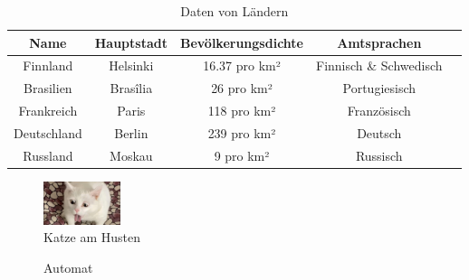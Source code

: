 \documentclass[12pt]{scrartcl}
\begin{document}
\exercise{}
\begin{table}[h!]
\centering
\begin{tabular}{c|c|c|c|c}
Name & Hauptstadt  & Bevölkerungsdichte & Amtsprachen \\ \hline \hline
Finnland & Helsinki & 16.37 pro km² & Finnisch \& Schwedisch  \\ \hline
Brasilien & Brasîlia & 26 pro km² & Portugiesisch  \\ \hline
Frankreich & Paris & 118 pro km² & Französisch  \\ \hline
Deutschland & Berlin & 239 pro km² & Deutsch \\ \hline
Russland & Moskau & 9 pro km² & Russisch \\ \hline
\end{tabular}
\caption{Daten von Ländern}
\label{tab:länderdaten}
\end{table}

\exercise{}
\begin{figure}[t!]
\centering
\includegraphics[width=0.2\textwidth]{cat.jpg}
\caption{Katze am Husten}
\label{fig:Katze}
\end{figure}

\exercise{}
\begin{figure}[h]
\centering
{}
\caption{Automat}
\label{tikz}
\end{figure}
\end{document}
